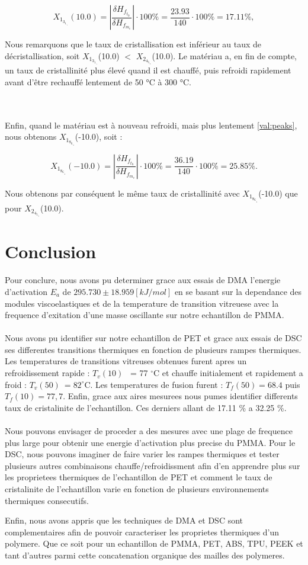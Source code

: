 \[
	X_1_3_1_._1(10.0) = |\frac{\delta H_f_t_h}{\delta H_f_m_e}| \cdot 100\% = \frac{23.93}{140} \cdot 100\% = 17.11 \%,
\]

Nous remarquons que le taux de cristallisation est inférieur au taux de décristallisation, soit $X_1_3_1_._1$(10.0) $<$ $X_2_4_5_._9$(10.0). Le matériau a, en fin de compte, un taux de cristallinité plus élevé quand il est chauffé, puis refroidi rapidement avant d’être rechauffé lentement de 50 °C à 300 °C.

\\\\
Enfin, quand le matériau est à nouveau refroidi, mais plus lentement \ref{val:peaks}, nous obtenons $X_1_8_6_._8$(-10.0), soit : 

\[
        X_1_8_6_._8(-10.0) = |\frac{\delta H_f_t_h}{\delta H_f_m_e}| \cdot 100\% = \frac{36.19}{140} \cdot 100\% = 25.85 \%.
\]

Nous obtenons par conséquent le même taux de cristallinité avec $X_1_8_6_._8$(-10.0) que pour $X_2_4_5_._9$(10.0).


\section{Conclusion}

Pour conclure, nous avons pu determiner grace aux essais de DMA l'energie d'activation $E_a$ de $295.730 \pm 18.959 [kJ/mol]$ en se basant sur la dependance des modules viscoelastiques et de la temperature de transition vitreuese avec la frequence d'exitation d'une masse oscillante sur notre echantillon de PMMA.
\\\\
Nous avons pu identifier sur notre echantillon de PET et grace aux essais de DSC ses differentes transitions thermiques en fonction de plusieurs rampes thermiques. Les temperatures de transitions vitreuses obtenues furent apres un refroidissement rapide : $T_v(10)$ ~= 77 $^\circ$C et chauffe initialement et rapidement a froid : $T_v(50) ~= 82 ^\circ$C. Les temperatures de fusion furent : $T_f(50) = 68.4$ puis $T_f(10) = 77,7$. Enfin, grace aux aires mesurees nous pumes identifier differents taux de cristalinite de l'echantillon. Ces derniers allant de 17.11 \% a 32.25 \%.
\\\\
Nous pouvons envisager de proceder a des mesures avec une plage de frequence plus large pour obtenir une energie d'activation plus precise du PMMA. Pour le DSC, nous pouvons imaginer de faire varier les rampes thermiques et tester plusieurs autres combinaisons chauffe/refroidissment afin d'en apprendre plus sur les proprietees thermiques de l'echantillon de PET et comment le taux de cristalinite de l'echantillon varie en fonction de plusieurs environnements thermiques consecutifs. 

Enfin, nous avons appris que les techniques de DMA et DSC sont complementaires afin de pouvoir caracteriser les proprietes thermiques d'un polymere. Que ce soit pour un echantillon de PMMA, PET, ABS, TPU, PEEK et tant d'autres parmi cette concatenation organique des mailles des polymeres.
